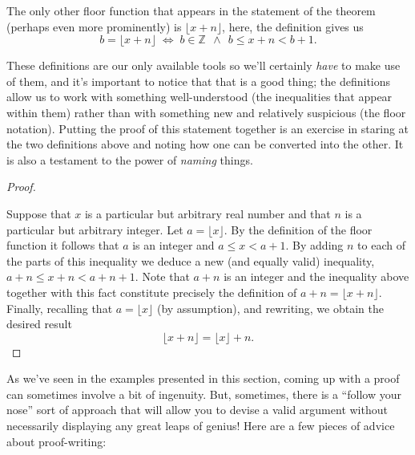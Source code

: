 \documentclass[10pt,]{book}
\theoremstyle{plain}
\theoremstyle{definition}
\theoremstyle{definition}
\numberwithin{equation}{section}
\newcommand{\Integers}{{\mathbb Z}}
\newcommand{\lt}{ < }
\begin{document}
    The only other floor function that appears in the statement of the theorem
    (perhaps even more prominently)
    is \(\lfloor x + n\rfloor\), here, the definition gives us
    \begin{equation*}
      b = \lfloor x + n \rfloor \; \iff \; 
      b \in \Integers \; \, \land \; \, b \leq x + n \lt  b+1.
    \end{equation*}
\par

    These definitions are our only available tools so we'll certainly \emph{have}
    to make use of them, and it's important to notice that that is a good thing;
    the definitions allow us to work with something well-understood
    (the inequalities that appear within them) rather than with something
    new and relatively suspicious (the floor notation). Putting the proof
    of this statement together is an exercise in staring at the two definitions
    above and noting how one can be converted into the other. It is also a
    testament to the power of \emph{naming} things.
\begin{proof}\hypertarget{proof-8}{}

      Suppose that \(x\) is a particular but arbitrary real number
      and that \(n\) is a particular but arbitrary integer. Let
      \(a = \lfloor x \rfloor\). By the definition of the floor function
      it follows that \(a\) is an integer and \(a \leq x \lt  a+1\). By adding
      \(n\) to each of the parts of this inequality
      we deduce a new (and equally valid) inequality, \(a+n \leq x+n \lt  a+n+1\).
      Note that \(a+n\) is an integer and the inequality above together with
      this fact constitute precisely the definition of
      \(a + n = \lfloor x + n \rfloor\). Finally, recalling that
      \(a = \lfloor x \rfloor\) (by assumption), and rewriting, we obtain the
      desired result
      \begin{equation*}
        \lfloor x + n \rfloor = \lfloor x \rfloor + n.
      \end{equation*}
\end{proof}
\par

  As we've seen in the examples presented in this section, coming up
  with a proof can sometimes involve a bit of ingenuity. But, sometimes,
  there is a ``follow your nose'' sort of approach that will
  allow you to devise a valid argument without necessarily displaying
  any great leaps of genius! Here are a few pieces
  of advice about proof-writing:
\end{document}
